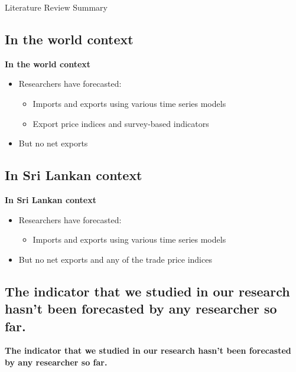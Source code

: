 \documentclass[11pt]{beamer}
\begin{document}
	\begin{frame}{Literature Review Summary}
		\subsection*{In the world context}
		\textbf{In the world context}
		\begin{itemize}
			\item Researchers have forecasted:
			\begin{itemize}
				\item Imports and exports using various time series models
				\item Export price indices and survey-based indicators
			\end{itemize}
			\item But no net exports
		\end{itemize}
		
		\vspace{0.5cm}
		
		\subsection*{In Sri Lankan context}
		\textbf{In Sri Lankan context}
		\begin{itemize}
			\item Researchers have forecasted:
			\begin{itemize}
				\item Imports and exports using various time series models
			\end{itemize}
			\item But no net exports and any of the trade price indices
		\end{itemize}
\vspace{0.5cm}		
		
		\subsection*{The indicator that we studied in our research hasn’t been forecasted by any researcher so far.}
		\textbf{The indicator that we studied in our research
			hasn’t been forecasted by any researcher so far.}
		

	\end{frame}
	
	
\end{document}
